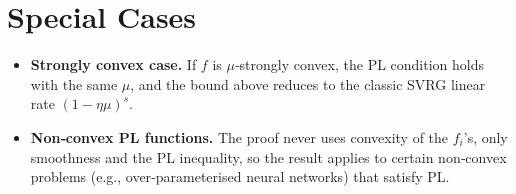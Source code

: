 \documentclass{article}
\begin{document}
\section*{Special Cases}
\begin{itemize}
    \item \textbf{Strongly convex case.} If $f$ is $\mu$‑strongly convex, the PL
          condition holds with the same $\mu$, and the bound above reduces to the
          classic SVRG linear rate $ (1-\eta\mu)^{s}$.
    \item \textbf{Non‑convex PL functions.} The proof never uses convexity of the $f_i$'s,
          only smoothness and the PL inequality, so the result applies to certain
          non‑convex problems (e.g., over‑parameterised neural networks) that satisfy PL.
\end{itemize}

\end{document}
